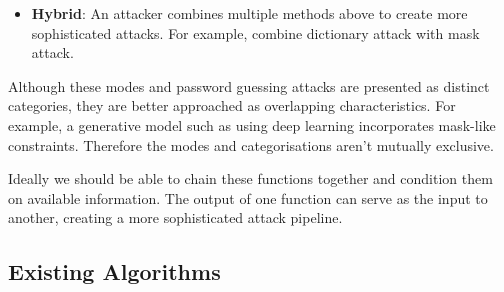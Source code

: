 \begin{itemize}
\begin{itemize}
        \item \textbf{Deep Learning}: Networks like RNNs and GANs learn patterns from leaked password databases to generate similar passwords. As more password databases become public, researchers increasingly use deep learning to crack passwords.
        
        \item \textbf{Machine Learning}: Algorithms like decision trees, random forests, and support vector machines help attackers predict which passwords to try first.
    \end{itemize}
    
    \item \textbf{Hybrid}: An attacker combines multiple methods above to create more sophisticated attacks. For example, combine dictionary attack with mask attack.
\end{itemize}

Although these modes and password guessing attacks are presented as distinct categories, they are better approached as overlapping characteristics. For example, a generative model such as \cwaecpg using deep learning incorporates mask-like constraints. Therefore the modes and categorisations aren't mutually exclusive.

Ideally we should be able to chain these functions together and condition them on available information. The output of one function can serve as the input to another, creating a more sophisticated attack pipeline.

\subsection{Existing Algorithms}

